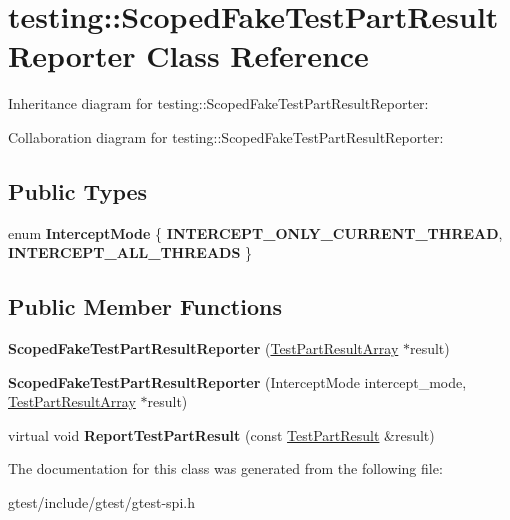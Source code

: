 \hypertarget{classtesting_1_1ScopedFakeTestPartResultReporter}{}\section{testing\+:\+:Scoped\+Fake\+Test\+Part\+Result\+Reporter Class Reference}
\label{classtesting_1_1ScopedFakeTestPartResultReporter}


Inheritance diagram for testing\+:\+:Scoped\+Fake\+Test\+Part\+Result\+Reporter\+:


Collaboration diagram for testing\+:\+:Scoped\+Fake\+Test\+Part\+Result\+Reporter\+:
\subsection*{Public Types}
\begin{DoxyCompactItemize}
\item 
\mbox{\label{classtesting_1_1ScopedFakeTestPartResultReporter_a82f6209b3cf5c4b15ec8bd8041dbc2d5}} 
enum {\bfseries Intercept\+Mode} \{ {\bfseries I\+N\+T\+E\+R\+C\+E\+P\+T\+\_\+\+O\+N\+L\+Y\+\_\+\+C\+U\+R\+R\+E\+N\+T\+\_\+\+T\+H\+R\+E\+AD}, 
{\bfseries I\+N\+T\+E\+R\+C\+E\+P\+T\+\_\+\+A\+L\+L\+\_\+\+T\+H\+R\+E\+A\+DS}
 \}
\end{DoxyCompactItemize}
\subsection*{Public Member Functions}
\begin{DoxyCompactItemize}
\item 
\mbox{\label{classtesting_1_1ScopedFakeTestPartResultReporter_aa0100ecf4799fb51d45167be6a5de1d5}} 
{\bfseries Scoped\+Fake\+Test\+Part\+Result\+Reporter} (\hyperlink{classtesting_1_1TestPartResultArray}{Test\+Part\+Result\+Array} $\ast$result)
\item 
\mbox{\label{classtesting_1_1ScopedFakeTestPartResultReporter_a57cbc09ed48627c8a73e622618dc4b4f}} 
{\bfseries Scoped\+Fake\+Test\+Part\+Result\+Reporter} (Intercept\+Mode intercept\+\_\+mode, \hyperlink{classtesting_1_1TestPartResultArray}{Test\+Part\+Result\+Array} $\ast$result)
\item 
\mbox{\label{classtesting_1_1ScopedFakeTestPartResultReporter_a3bc6cb939cbc3db71ece8846e6bafe00}} 
virtual void {\bfseries Report\+Test\+Part\+Result} (const \hyperlink{classtesting_1_1TestPartResult}{Test\+Part\+Result} \&result)
\end{DoxyCompactItemize}


The documentation for this class was generated from the following file\+:\begin{DoxyCompactItemize}
\item 
gtest/include/gtest/gtest-\/spi.\+h\end{DoxyCompactItemize}

